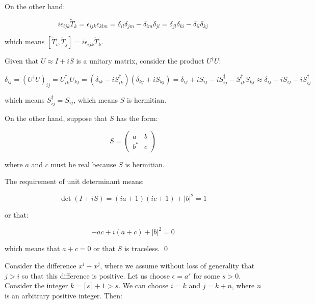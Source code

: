 \documentclass[12pt]{article}
\begin{document}
On the other hand:

\begin{equation}
    i\epsilon_{ijk} \tilde{T}_{k} = \epsilon_{ijk} \epsilon_{klm} = \delta_{il} \delta_{jm} - \delta_{im} \delta_{jl} = \delta_{jl} \delta_{ki} - \delta_{il} \delta_{kj}
\end{equation}

which means $[\tilde{T}_{i}, \tilde{T}_{j}] = i\epsilon_{ijk} \tilde{T}_{k}$.

Given that $U \approx I + iS$ is a unitary matrix, consider the product $U^{\dagger} U$:

\begin{equation}
    \delta_{ij} = (U^{\dagger} U)_{ij} = U^{\dagger}_{ik} U_{kj} = (\delta_{ik} - i S^{\dagger}_{ik})(\delta_{kj} + i S_{kj}) = \delta_{ij} + i S_{ij} - i S^{\dagger}_{ij} - S^{\dagger}_{ik} S_{kj} \approx \delta_{ij} + i S_{ij} - i S^{\dagger}_{ij}
\end{equation}

which means $S^{\dagger}_{ij} = S_{ij}$, which means $S$ is hermitian.

On the other hand, suppose that $S$ has the form:

\begin{equation}
    S = 
    \begin{pmatrix}
        a & b \\
        b^{*} & c
    \end{pmatrix}
\end{equation}

where $a$ and $c$ must be real because $S$ is hermitian.

The requirement of unit determinant means:

\begin{equation}
    \det{(I + iS)} = (ia + 1)(ic + 1) + \left\lvert b \right\rvert^{2} = 1
\end{equation}

or that:

\begin{equation}
    -ac + i(a + c) + \left\lvert b \right\rvert^{2} = 0
\end{equation}

which means that $a + c =0$ or that $S$ is traceless.
\qed



Consider the difference $x^{i} - x^{j}$, where we assume without loss of generality that $j > i$ so that this difference is positive. Let us choose $\epsilon = a^{s}$ for some $s > 0$. Consider the integer $k = \lceil s \rceil + 1 > s$. We can choose $i = k$ and $j = k + n$, where $n$ is an arbitrary positive integer. Then:
\end{document}
